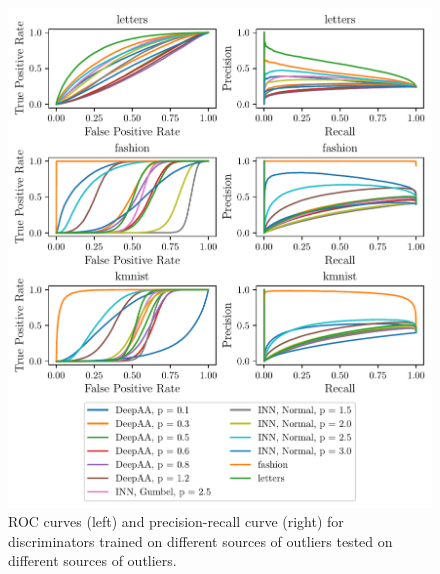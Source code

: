 \begin{figure}[htpb]
    \centering
    \includegraphics{figures/samples/emnist_disc_curve.pdf}
    \caption{ROC curves (left) and precision-recall curve (right) for
    discriminators trained on different sources of outliers tested on different
    sources of outliers.}%
    \label{fig:emnist_stat_disc}
\end{figure}

